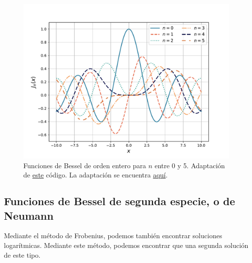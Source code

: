 \begin{figure}[htbp]
    \centering
    \includegraphics[width = 12cm]{Figuras/Bessel_first_Kind.pdf}
    \caption{Funciones de Bessel de orden entero para $n$ entre 0 y 5. Adaptación de \href{https://github.com/gfrubi/FM2/blob/master/figuras-editables/fig-Bessel.py}{este} código. La adaptación se encuentra \href{aa}{aquí}.}
    \label{fig:Bessel_entero}
\end{figure}

\subsection{Funciones de Bessel de segunda especie, o de Neumann}

Mediante el método de Frobenius, podemos también encontrar soluciones logarítmicas. Mediante este método, podemos encontrar que una segunda solución de este tipo.

